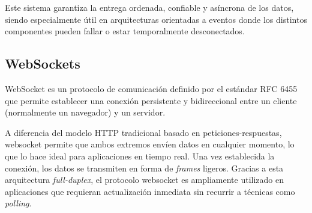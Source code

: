 Este sistema garantiza la entrega ordenada, confiable y asíncrona de los datos, siendo especialmente útil en arquitecturas orientadas a eventos donde los distintos componentes pueden fallar o estar temporalmente desconectados.

\subsection{WebSockets}

WebSocket es un protocolo de comunicación definido por el estándar RFC 6455~\citep{rfc6455_websocket} que permite establecer una conexión persistente y bidireccional entre un cliente (normalmente un navegador) y un servidor.


A diferencia del modelo HTTP tradicional basado en peticiones-respuestas, websocket permite que ambos extremos envíen datos en cualquier momento, lo que lo hace ideal para aplicaciones en tiempo real.
Una vez establecida la conexión, los datos se transmiten en forma de \emph{frames} ligeros.
Gracias a esta arquitectura \emph{full-duplex}, el protocolo websocket es ampliamente utilizado en aplicaciones que requieran actualización inmediata sin recurrir a técnicas como \emph{polling}.


